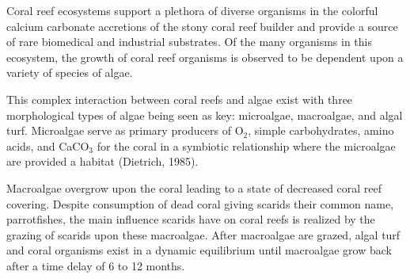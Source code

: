 Coral reef ecosystems support a plethora of diverse organisms in the colorful calcium carbonate accretions of the stony coral reef builder and provide a source of rare biomedical and industrial substrates. Of the many organisms in this ecosystem, the growth of coral reef organisms is observed to be dependent upon a variety of species of algae. 

This complex interaction between coral reefs and algae exist with three morphological types of algae being seen as key: microalgae, macroalgae, and algal turf. Microalgae serve as primary producers of O$_2$, simple carbohydrates, amino acids, and CaCO$_3$ for the coral in a symbiotic relationship where the microalgae are provided a habitat (Dietrich, 1985). 

Macroalgae overgrow upon the coral leading to a state of decreased coral reef covering. Despite consumption of dead coral giving scarids their common name, parrotfishes, the main influence scarids have on coral reefs is realized by the grazing of scarids upon these macroalgae. After macroalgae are grazed, algal turf and coral organisms exist in a dynamic equilibrium until macroalgae grow back after a time delay of 6 to 12 months.